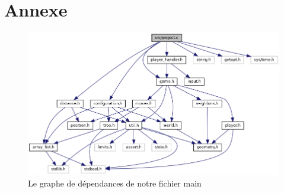 \section{Annexe}
\begin{figure}[H]
    \label{fig:dep-projet}
    \centering \includegraphics[width=\linewidth]{images/project_8c__incl.png}
    \caption{Le graphe de dépendances de notre fichier main}
\end{figure}